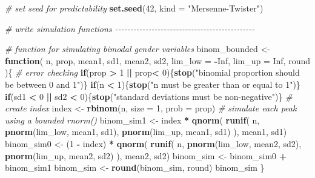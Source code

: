 \documentclass[
]{book}
\newenvironment{Shaded}{\begin{snugshade}}{\end{snugshade}}
\newcommand{\AttributeTok}[1]{\textcolor[rgb]{0.13,0.29,0.53}{#1}}
\newcommand{\CommentTok}[1]{\textcolor[rgb]{0.56,0.35,0.01}{\textit{#1}}}
\newcommand{\ConstantTok}[1]{\textcolor[rgb]{0.56,0.35,0.01}{#1}}
\newcommand{\ControlFlowTok}[1]{\textcolor[rgb]{0.13,0.29,0.53}{\textbf{#1}}}
\newcommand{\DecValTok}[1]{\textcolor[rgb]{0.00,0.00,0.81}{#1}}
\newcommand{\FunctionTok}[1]{\textcolor[rgb]{0.13,0.29,0.53}{\textbf{#1}}}
\newcommand{\NormalTok}[1]{#1}
\newcommand{\OtherTok}[1]{\textcolor[rgb]{0.56,0.35,0.01}{#1}}
\newcommand{\SpecialCharTok}[1]{\textcolor[rgb]{0.81,0.36,0.00}{\textbf{#1}}}
\newcommand{\StringTok}[1]{\textcolor[rgb]{0.31,0.60,0.02}{#1}}
\begin{document}
\begin{Shaded}
\begin{Highlighting}[]
\CommentTok{\# set seed for predictability}
\FunctionTok{set.seed}\NormalTok{(}\DecValTok{42}\NormalTok{, }\AttributeTok{kind =} \StringTok{"Mersenne{-}Twister"}\NormalTok{)}

\CommentTok{\# write simulation functions {-}{-}{-}{-}{-}{-}{-}{-}{-}{-}{-}{-}{-}{-}{-}{-}{-}{-}{-}{-}{-}{-}{-}{-}{-}{-}{-}{-}{-}{-}{-}{-}{-}{-}{-}{-}{-}{-}{-}{-}{-}{-}{-}{-}{-}{-}}

\CommentTok{\# function for simulating bimodal gender variables}
\NormalTok{binom\_bounded }\OtherTok{\textless{}{-}} \ControlFlowTok{function}\NormalTok{(}
\NormalTok{    n, prop, mean1, sd1, mean2, sd2, }\AttributeTok{lim\_low =} \SpecialCharTok{{-}}\ConstantTok{Inf}\NormalTok{, }\AttributeTok{lim\_up =} \ConstantTok{Inf}\NormalTok{, round}
\NormalTok{    )\{}
  \CommentTok{\# error checking}
  \ControlFlowTok{if}\NormalTok{(prop }\SpecialCharTok{\textgreater{}} \DecValTok{1} \SpecialCharTok{||}\NormalTok{ prop}\SpecialCharTok{\textless{}} \DecValTok{0}\NormalTok{)\{}\FunctionTok{stop}\NormalTok{(}\StringTok{"binomial proportion should be between 0 and 1"}\NormalTok{)\}}
  \ControlFlowTok{if}\NormalTok{(n }\SpecialCharTok{\textless{}} \DecValTok{1}\NormalTok{)\{}\FunctionTok{stop}\NormalTok{(}\StringTok{"n must be greater than or equal to 1"}\NormalTok{)\}}
  \ControlFlowTok{if}\NormalTok{(sd1 }\SpecialCharTok{\textless{}} \DecValTok{0} \SpecialCharTok{||}\NormalTok{ sd2 }\SpecialCharTok{\textless{}} \DecValTok{0}\NormalTok{)\{}\FunctionTok{stop}\NormalTok{(}\StringTok{"standard deviations must be non{-}negative"}\NormalTok{)\}}
  \CommentTok{\# create index}
\NormalTok{  index }\OtherTok{\textless{}{-}} \FunctionTok{rbinom}\NormalTok{(n, }\AttributeTok{size =} \DecValTok{1}\NormalTok{, }\AttributeTok{prob =}\NormalTok{ prop)}
  \CommentTok{\# simulate each peak using a bounded \textasciigrave{}rnorm()\textasciigrave{}}
\NormalTok{  binom\_sim1 }\OtherTok{\textless{}{-}}\NormalTok{ index }\SpecialCharTok{*} \FunctionTok{qnorm}\NormalTok{(}
    \FunctionTok{runif}\NormalTok{(}
\NormalTok{      n, }\FunctionTok{pnorm}\NormalTok{(lim\_low, mean1, sd1), }\FunctionTok{pnorm}\NormalTok{(lim\_up, mean1, sd1)}
\NormalTok{      ), }
\NormalTok{    mean1, sd1)}
\NormalTok{  binom\_sim0 }\OtherTok{\textless{}{-}}\NormalTok{ (}\DecValTok{1} \SpecialCharTok{{-}}\NormalTok{ index) }\SpecialCharTok{*} \FunctionTok{qnorm}\NormalTok{(}
    \FunctionTok{runif}\NormalTok{(}
\NormalTok{      n, }\FunctionTok{pnorm}\NormalTok{(lim\_low, mean2, sd2), }\FunctionTok{pnorm}\NormalTok{(lim\_up, mean2, sd2)}
\NormalTok{      ), }
\NormalTok{    mean2, sd2)}
\NormalTok{  binom\_sim }\OtherTok{\textless{}{-}}\NormalTok{ binom\_sim0 }\SpecialCharTok{+}\NormalTok{ binom\_sim1}
\NormalTok{  binom\_sim }\OtherTok{\textless{}{-}} \FunctionTok{round}\NormalTok{(binom\_sim, round)}
\NormalTok{  binom\_sim}
\NormalTok{\}}



\end{Highlighting}
\end{Shaded}
\end{document}
